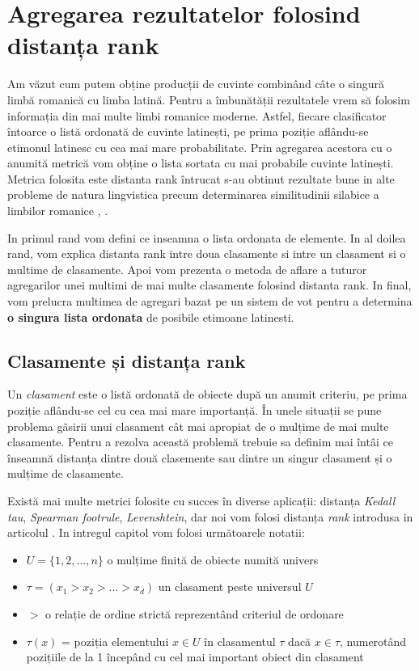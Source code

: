 \chapter{Agregarea rezultatelor folosind distanța rank}
Am văzut cum putem obține producții de cuvinte combinând câte o singură limbă romanică cu 
limba latină. Pentru a îmbunătății rezultatele vrem să folosim informația din mai multe 
limbi romanice moderne. Astfel, fiecare clasificator întoarce o listă ordonată de cuvinte latinești, 
pe prima poziție aflându-se etimonul latinesc cu cea mai mare probabilitate. Prin agregarea 
acestora cu o anumită metrică vom obține o lista sortata cu mai probabile cuvinte latinești. Metrica
folosita este distanta rank \cite{rankdistance} întrucat s-au obtinut rezultate bune in alte 
probleme de natura lingvistica precum determinarea similitudinii silabice a limbilor romanice 
\cite{syllabicsim}, \cite{simnat}.

In primul rand vom defini ce inseamna o lista ordonata de elemente. In al doilea rand, vom explica
distanta rank intre doua clasamente si intre un clasament si o multime de clasamente. Apoi vom
prezenta o metoda de aflare a tuturor agregarilor unei multimi de mai multe clasamente folosind
distanta rank. In final, vom prelucra multimea de agregari bazat pe un sistem de vot pentru a 
determina \textbf{o singura lista ordonata} de posibile etimoane latinesti.

\section{Clasamente și distanța rank}
Un \textit{clasament} este o listă ordonată de obiecte după un anumit criteriu, pe prima poziție 
aflându-se cel cu cea mai mare importanță. În unele situații se pune problema găsirii unui clasament
cât mai apropiat de o mulțime de mai multe clasamente. Pentru a rezolva această problemă trebuie sa
definim mai întâi ce înseamnă distanța dintre două clasemente sau dintre un singur clasament și o
mulțime de clasamente.

Există mai multe metrici folosite cu succes în diverse aplicații: distanța \textit{Kedall tau}, 
\textit{Spearman footrule}, \textit{Levenshtein}, dar noi vom folosi distanța \textit{rank}
introdusa in articolul \cite{rankdistance}. In intregul capitol vom folosi următoarele notatii:
\begin{itemize}
    \item $U = \{1, 2, ..., n\}$ o mulțime finită de obiecte numită univers 
    \item $\tau = (x_1 > x_2 > ... > x_d)$ un clasament peste universul $U$ 
    \item $>$ o relație de ordine strictă reprezentând criteriul de ordonare 
    \item $\tau(x)$ = poziția elementului $x \in U$ în clasamentul $\tau$ dacă $x \in \tau$, 
      numerotând pozițiile de la 1 începând cu cel mai important obiect din clasament
\end{itemize}

